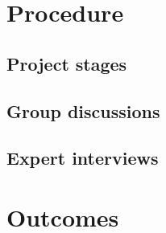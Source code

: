 
\section{Procedure}
\label{chapter3-procedure}

\subsection{Project stages}
\label{chapter3-project-stages}




\subsection{Group discussions}
\label{chapter3-group-discussions}

\subsection{Expert interviews}
\label{chapter3-expert-interviews}

\section{Outcomes}
\label{chapter3-outcomes}

